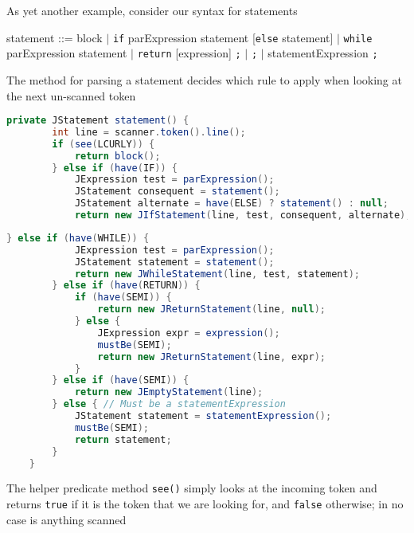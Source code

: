 \documentclass[8pt,a4paper,compress]{beamer}
\newcommand{\mm}[1]{$#1$}
\newenvironment{spaced}
{
\smallskip
\hspace{.5cm}
\begin{minipage}[c]{\textwidth}
}
{
\end{minipage}
\smallskip
}
\begin{document}
\begin{frame}[fragile]
\pause

As yet another example, consider our syntax for statements

\text{ }
\begin{spaced}
\begin{production}
statement ::= block
                  \mm{|} \lstinline{if} parExpression statement [\lstinline{else} statement]
                  \mm{|} \lstinline{while} parExpression statement
                  \mm{|} \lstinline{return} [expression] \lstinline{;}
                  \mm{|} \lstinline{;}
                  \mm{|} statementExpression \lstinline{;}
\end{production}
\end{spaced}

\pause
\bigskip

The method for parsing a statement decides which rule to apply when looking at the next un-scanned token

\begin{lstlisting}[language=Java]
    private JStatement statement() {
        int line = scanner.token().line();
        if (see(LCURLY)) {
            return block();
        } else if (have(IF)) {
            JExpression test = parExpression();
            JStatement consequent = statement();
            JStatement alternate = have(ELSE) ? statement() : null;
            return new JIfStatement(line, test, consequent, alternate);
\end{lstlisting}
\end{frame}

\begin{frame}[fragile]
\pause

\begin{lstlisting}[language=Java]
        } else if (have(WHILE)) {
            JExpression test = parExpression();
            JStatement statement = statement();
            return new JWhileStatement(line, test, statement);
        } else if (have(RETURN)) {
            if (have(SEMI)) {
                return new JReturnStatement(line, null);
            } else {
                JExpression expr = expression();
                mustBe(SEMI);
                return new JReturnStatement(line, expr);
            }
        } else if (have(SEMI)) {
            return new JEmptyStatement(line);
        } else { // Must be a statementExpression
            JStatement statement = statementExpression();
            mustBe(SEMI);
            return statement;
        }
    }
\end{lstlisting}

\pause
\bigskip

The helper predicate method \lstinline{see()} simply looks at the incoming token and returns \lstinline{true} if it is the token that we are looking for, and \lstinline{false} otherwise; in no case is anything scanned
\end{frame}
\end{document}
